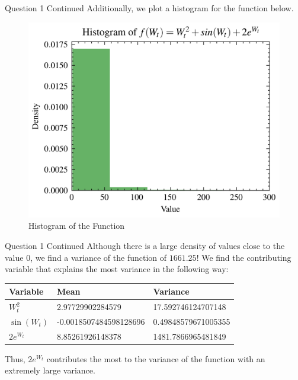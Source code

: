\documentclass[compress,12pt]{beamer}
\begin{document}
\begin{frame}{Question 1 Continued}
    Additionally, we plot a histogram for the function below.

    \begin{figure}
        \centering
        \includegraphics{imgs/histogram.png}
        \caption{Histogram of the Function}
        \label{fig:convergence}
    \end{figure}
\end{frame}

\begin{frame}{Question 1 Continued}
    Although there is a large density of values close to the value $0$, we find a variance of the function of $1661.25$! We find the contributing variable that explains the most variance in the following way:
    \begin{table}[H]
        \centering
        \begin{tabular}{@{}lll@{}}
        \toprule
        Variable & Mean & Variance \\ \midrule
        $W_t^2$ & 2.97729902284579 & 17.592746124707148 \\
        $\sin(W_t)$ & -0.0018507484598128696 & 0.49848579671005355 \\
        $2e^{W_t}$ & 8.85261926148378 & 1481.7866965481849 \\ \bottomrule
        \end{tabular}
    \end{table}

    Thus, $2e^{W_t}$ contributes the most to the variance of the function with an extremely large variance.
\end{frame}
\end{document}
